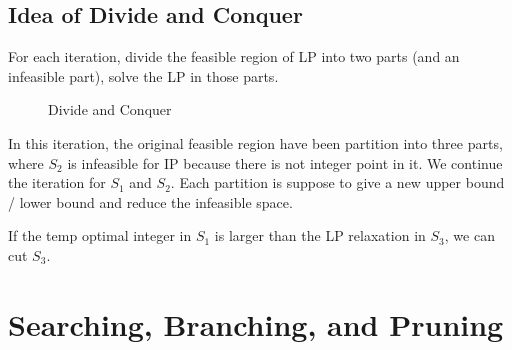         \subsection{Idea of Divide and Conquer}
            For each iteration, divide the feasible region of LP into two parts (and an infeasible part), solve the LP in those parts.\\
            \begin{figure}[H]
                \centering
                \caption{Divide and Conquer}
            \end{figure}
            In this iteration, the original feasible region have been partition into three parts, where $S_2$ is infeasible for IP because there is not integer point in it. We continue the iteration for $S_1$ and $S_2$. Each partition is suppose to give a new upper bound / lower bound and reduce the infeasible space.

            If the temp optimal integer in $S_1$ is larger than the LP relaxation in $S_3$, we can cut $S_3$.
            
    \section{Searching, Branching, and Pruning}
